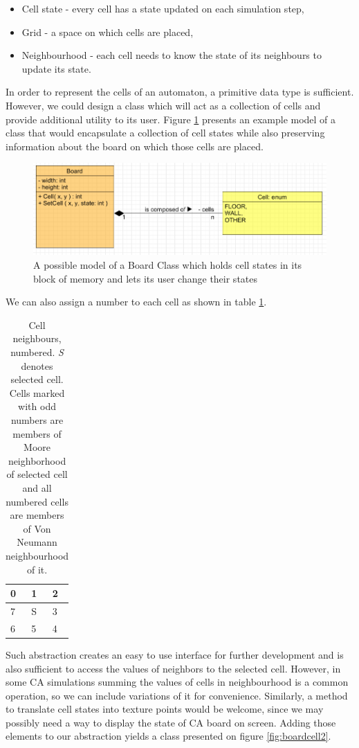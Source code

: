 \documentclass[12pt]{report}
\newcommand{\td}[1]{\todo[inline]{TO DO: #1}}
\begin{document}
\begin{itemize}
	\item Cell state - every cell has a state updated on each simulation step,
	\item Grid - a space on which cells are placed,
	\item Neighbourhood - each cell needs to know the state of its neighbours to update its state.
\end{itemize}

In order to represent the cells of an automaton, a primitive data type is sufficient. However, we could design a class which will act as a collection of cells and provide additional utility to its user. Figure \ref{fig:boardcell} presents an example model of a class that would encapsulate a collection of cell states while also preserving information about the board on which those cells are placed. 

\begin{figure}[h]
	\centering
	\includegraphics[width=0.8\linewidth]{diagrams/boardcell01}
	\caption{ A possible model of a Board Class which holds cell states in its block of memory and lets its user change their states} 
	\label{fig:boardcell}
\end{figure}

We can also assign a number to each cell \td{why?} as shown in table \ref{tab:cellneighbors}.

\begin{table}[h]
	\centering
	\begin{tabular}{| l | l | l |}
		\hline 
		0 & 1 & 2 \\
		\hline
		7 & S & 3 \\
		\hline
		6 & 5 & 4 \\ 
		\hline
	\end{tabular}
	\caption{Cell neighbours, numbered. \textit{S} denotes selected cell. Cells marked with odd numbers are members of Moore neighborhood of selected cell and all numbered cells are members of Von Neumann neighbourhood of it. }
	\label{tab:cellneighbors}
\end{table}


Such abstraction creates an easy to use interface for further development and is also sufficient to access the values of neighbors to the selected cell. However, in some CA simulations summing the values of cells in neighbourhood is a common operation, so we can include variations of it for convenience. Similarly, a method to translate cell states into texture points would be welcome, since we may possibly need a way to display the state of CA board on screen. Adding those elements to our abstraction yields a class presented on figure \ref{fig:boardcell2}.
 
\end{document}
